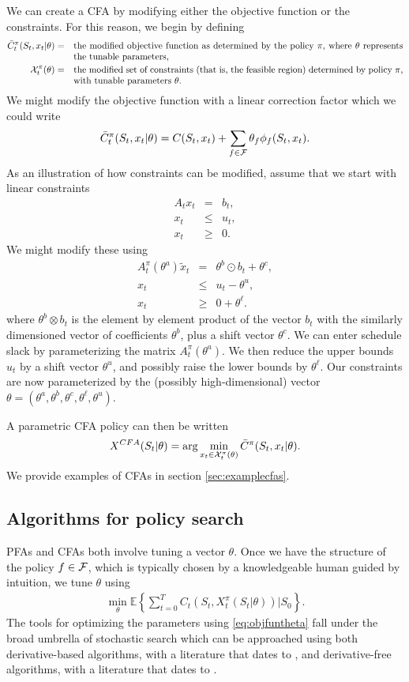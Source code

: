 \documentclass[11pt,oneside,fleqn,reqno,titlepage]{article}
\newcommand{\E}{\mathbb{E}}
\newcommand{\bn}{\begin{eqnarray}}
\newcommand{\en}{\end{eqnarray}}
\newcommand{\bns}{\begin{eqnarray*}}
\newcommand{\ens}{\end{eqnarray*}}
\newcommand{\textwrap}{\parbox[t]{5.0in}}
\newcounter{example}
\newcommand{\argmin}{{\rm arg}\min}
\def \xtilde{{\tilde x}}
\def \Cbar{\bar C}
\def \Fcal{{\cal F}}
\def \Xcal{{\cal X}}
\begin{document}
We can create a CFA by modifying either the objective function or the constraints.  For this reason, we begin by defining
\bns
\Cbar^\pi_t(S_t,x_t|\theta) &=& \textwrap{the modified objective function as determined by the policy $\pi$, where $\theta$ represents the tunable parameters,}\\
\Xcal^\pi_t(\theta) &=& \textwrap{the modified set of constraints (that is, the feasible region) determined by policy $\pi$, with tunable parameters $\theta$.}
\ens
We might modify the objective function with a linear correction factor which we could write
\bn
\Cbar^\pi_t(S_t,x_t|\theta) = C(S_t,x_t) + \sum_{f\in\Fcal} \theta_f \phi_f(S_t,x_t). \label{eq:linearobjcorrection}
\en
As an illustration of how constraints can be modified, assume that we start with linear constraints
\bn
A_t x_t &=& b_t, \\
x_t & \leq & u_t,\\
x_t & \geq & 0.
\en
We might modify these using
\bn
A^\pi_t(\theta^a) \xtilde_t &   =  &  \theta^b \odot b_t + \theta^c, \label{eq:constraintcorrection1}\\
x_t                         & \leq &  u_t-\theta^u,\label{eq:constraintcorrection2}\\
x_t                         & \geq &  0 + \theta^\ell. \label{eq:constraintcorrection3}
\en
where $\theta^b \otimes b_t$ is the element by element product of the vector $b_t$ with the similarly dimensioned vector of coefficients $\theta^b$, plus a shift vector $\theta^c$.  We can enter schedule slack by parameterizing the matrix $A^\pi_t(\theta^a)$.  We then reduce the upper bounds $u_t$ by a shift vector $\theta^u$, and possibly raise the lower bounds by $\theta^\ell$.  Our constraints are now parameterized by the (possibly high-dimensional) vector $\theta = (\theta^a, \theta^b, \theta^c, \theta^\ell, \theta^u)$.

A parametric CFA policy can then be written
\bn
X^{CFA}(S_t|\theta) = \argmin_{x_t\in\Xcal^\pi_t(\theta)} \Cbar^\pi(S_t,x_t|\theta). \label{eq:cfa}
\en
We provide examples of CFAs in section \ref{sec:examplecfas}.


\subsection{Algorithms for policy search}
\label{sec:algorithmsforpolicysearch}
PFAs and CFAs both involve tuning a vector $\theta$.  Once we have the structure of the policy $f\in\Fcal$, which is typically chosen by a knowledgeable human guided by intuition, we tune $\theta$ using
\bn
\min_{\theta} \E\left\{\sum_{t=0}^T C_t(S_t,X^\pi_t(S_t|\theta)) \big| S_0\right\}. \label{eq:objfuntheta}
\en
The tools for optimizing the parameters using \eqref{eq:objfuntheta} fall under the broad umbrella of stochastic search which can be approached using both derivative-based algorithms, with a literature that dates to \cite{RoMo51}, and derivative-free algorithms, with a literature that dates to \cite{Box1951}.
\end{document}

